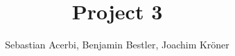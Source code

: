 \documentclass[paper=a4,11pt,oneside]{article}
\theoremstyle{definition}
\theoremstyle{definition}
\theoremstyle{definition}
\theoremstyle{definition}
\theoremstyle{definition}
\theoremstyle{definition}
\theoremstyle{definition}
\theoremstyle{remark}
\theoremstyle{definition}
\begin{document}
\newpage
\title{Project 3}
\author{Sebastian Acerbi, Benjamin Bestler, Joachim Kr\"oner}
\thispagestyle{empty} 

\maketitle
\tableofcontents



\end{document}
